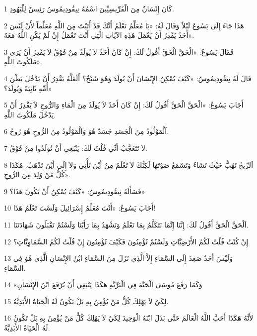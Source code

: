 \par 1 كَانَ إِنْسَانٌ مِنَ الْفَرِّيسِيِّينَ اسْمُهُ نِيقُودِيمُوسُ رَئِيسٌ لِلْيَهُودِ.
\par 2 هَذَا جَاءَ إِلَى يَسُوعَ لَيْلاً وَقَالَ لَهُ: «يَا مُعَلِّمُ نَعْلَمُ أَنَّكَ قَدْ أَتَيْتَ مِنَ اللَّهِ مُعَلِّماً لأَنْ لَيْسَ أَحَدٌ يَقْدِرُ أَنْ يَعْمَلَ هَذِهِ الآيَاتِ الَّتِي أَنْتَ تَعْمَلُ إِنْ لَمْ يَكُنِ اللَّهُ مَعَهُ».
\par 3 فَقَالَ يَسُوعُ: «الْحَقَّ الْحَقَّ أَقُولُ لَكَ: إِنْ كَانَ أَحَدٌ لاَ يُولَدُ مِنْ فَوْقُ لاَ يَقْدِرُ أَنْ يَرَى مَلَكُوتَ اللَّهِ».
\par 4 قَالَ لَهُ نِيقُودِيمُوسُ: «كَيْفَ يُمْكِنُ الإِنْسَانَ أَنْ يُولَدَ وَهُوَ شَيْخٌ؟ أَلَعَلَّهُ يَقْدِرُ أَنْ يَدْخُلَ بَطْنَ أُمِّهِ ثَانِيَةً وَيُولَدَ؟»
\par 5 أَجَابَ يَسُوعُ: «الْحَقَّ الْحَقَّ أَقُولُ لَكَ: إِنْ كَانَ أَحَدٌ لاَ يُولَدُ مِنَ الْمَاءِ وَالرُّوحِ لاَ يَقْدِرُ أَنْ يَدْخُلَ مَلَكُوتَ اللَّهِ.
\par 6 اَلْمَوْلُودُ مِنَ الْجَسَدِ جَسَدٌ هُوَ وَالْمَوْلُودُ مِنَ الرُّوحِ هُوَ رُوحٌ.
\par 7 لاَ تَتَعَجَّبْ أَنِّي قُلْتُ لَكَ: يَنْبَغِي أَنْ تُولَدُوا مِنْ فَوْقُ.
\par 8 اَلرِّيحُ تَهُبُّ حَيْثُ تَشَاءُ وَتَسْمَعُ صَوْتَهَا لَكِنَّكَ لاَ تَعْلَمُ مِنْ أَيْنَ تَأْتِي وَلاَ إِلَى أَيْنَ تَذْهَبُ. هَكَذَا كُلُّ مَنْ وُلِدَ مِنَ الرُّوحِ».
\par 9 فَسَأَلَهُ نِيقُودِيمُوسُ: «كَيْفَ يُمْكِنُ أَنْ يَكُونَ هَذَا؟»
\par 10 أَجَابَ يَسُوعُ: «أَنْتَ مُعَلِّمُ إِسْرَائِيلَ وَلَسْتَ تَعْلَمُ هَذَا!
\par 11 اَلْحَقَّ الْحَقَّ أَقُولُ لَكَ: إِنَّنَا إِنَّمَا نَتَكَلَّمُ بِمَا نَعْلَمُ وَنَشْهَدُ بِمَا رَأَيْنَا وَلَسْتُمْ تَقْبَلُونَ شَهَادَتَنَا.
\par 12 إِنْ كُنْتُ قُلْتُ لَكُمُ الأَرْضِيَّاتِ وَلَسْتُمْ تُؤْمِنُونَ فَكَيْفَ تُؤْمِنُونَ إِنْ قُلْتُ لَكُمُ السَّمَاوِيَّاتِ؟
\par 13 وَلَيْسَ أَحَدٌ صَعِدَ إِلَى السَّمَاءِ إِلاَّ الَّذِي نَزَلَ مِنَ السَّمَاءِ ابْنُ الإِنْسَانِ الَّذِي هُوَ فِي السَّمَاءِ.
\par 14 «وَكَمَا رَفَعَ مُوسَى الْحَيَّةَ فِي الْبَرِّيَّةِ هَكَذَا يَنْبَغِي أَنْ يُرْفَعَ ابْنُ الإِنْسَانِ
\par 15 لِكَيْ لاَ يَهْلِكَ كُلُّ مَنْ يُؤْمِنُ بِهِ بَلْ تَكُونُ لَهُ الْحَيَاةُ الأَبَدِيَّةُ.
\par 16 لأَنَّهُ هَكَذَا أَحَبَّ اللَّهُ الْعَالَمَ حَتَّى بَذَلَ ابْنَهُ الْوَحِيدَ لِكَيْ لاَ يَهْلِكَ كُلُّ مَنْ يُؤْمِنُ بِهِ بَلْ تَكُونُ لَهُ الْحَيَاةُ الأَبَدِيَّةُ.
